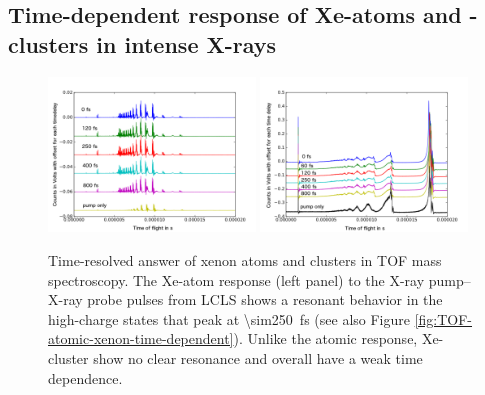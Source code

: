 \subsection{Time-dependent response of Xe-atoms and -clusters in intense X-rays}\label{sec:time-resolved-xe-atoms}
\begin{figure}
	\centering
		\includegraphics[width=0.49\textwidth]{images/results/TOF-atomic-xenon.png}
		\includegraphics[width=0.49\textwidth]{images/results/TOF-regular-cluster-xenon.png}
	\caption[Time-resolved answer of xenon atoms and clusters in TOF spectroscopy.]{Time-resolved answer of xenon atoms and clusters in TOF mass spectroscopy. The Xe-atom response (left panel) to the X-ray pump--X-ray probe pulses from LCLS shows a resonant behavior in the high-charge states that peak at \SI{\sim250}{\femto\second} (see also Figure \ref{fig:TOF-atomic-xenon-time-dependent}). Unlike the atomic response, Xe-cluster show no clear resonance and overall have a weak time dependence.}
	\label{fig:TOF-traces-xenon}
\end{figure}

